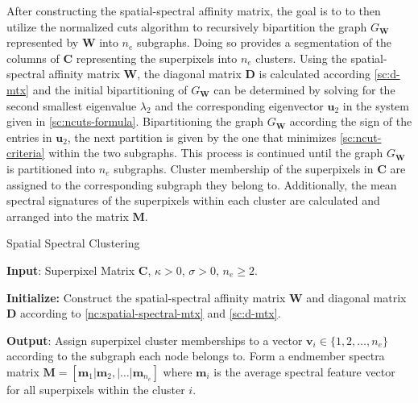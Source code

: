 After constructing the spatial-spectral affinity matrix, the goal is to to then utilize the normalized cuts algorithm to recursively bipartition the graph $G_\mathbf{W}$ represented by $\mathbf{W}$ into $n_e$ subgraphs. Doing so provides a segmentation of the columns of $\mathbf{C}$ representing the superpixels into $n_e$ clusters. Using the spatial-spectral affinity matrix $\mathbf{W}$, the diagonal matrix $\mathbf{D}$ is calculated according \eqref{sc:d-mtx} and the initial bipartitioning of $G_\mathbf{W}$ can be determined by solving for the second smallest eigenvalue $\lambda_2$ and the corresponding eigenvector $\mathbf{u}_2$ in the system given in \eqref{sc:ncuts-formula}. Bipartitioning the graph $G_\mathbf{W}$ according the sign of the entries in $\mathbf{u}_2$, the next partition is given by the one that minimizes \eqref{sc:ncut-criteria} within the two subgraphs. This process is continued until the graph $G_\mathbf{W}$ is partitioned into $n_e$ subgraphs. Cluster membership of the superpixels in $\mathbf{C}$ are assigned to the corresponding subgraph they belong to. Additionally, the mean spectral signatures of the superpixels within each cluster are calculated and arranged into the matrix $\mathbf{M}$.

\begin{algorithm}[H]
    \caption{Spatial Spectral Clustering}
    \textbf{Input}: Superpixel Matrix $\mathbf{C}$, $\kappa > 0$, $\sigma > 0$, $n_e \geq 2$.

    \textbf{Initialize:} Construct the spatial-spectral affinity matrix $\mathbf{W}$ and diagonal matrix $\mathbf{D}$ according to \eqref{nc:spatial-spectral-mtx} and \eqref{sc:d-mtx}.\\


    \textbf{Output}: Assign superpixel cluster memberships to a vector $\mathbf{v}_i \in \{1, 2, \dots ,n_e\}$ according to the subgraph each node belongs to. Form a endmember spectra matrix $\mathbf{M} = [ \mathbf{m}_1 | \mathbf{m}_2, | \dots | \mathbf{m}_{n_e} ]$ where $\mathbf{m}_i$ is the average spectral feature vector for all superpixels within the cluster $i$.
\end{algorithm}

